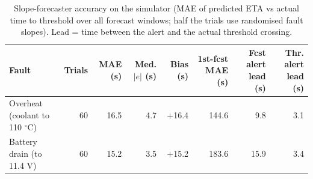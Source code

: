 \begin{table}[t]
\centering
\caption{Slope-forecaster accuracy on the simulator (MAE of predicted ETA vs actual time to threshold over all forecast windows; half the trials use randomised fault slopes). Lead = time between the alert and the actual threshold crossing.}
\label{tab:sys_forecast}
\scriptsize
\begin{tabular}{lrrrrrrr}
\toprule
Fault & Trials & MAE (s) & Med. $|e|$ (s) & Bias (s) & 1st-fcst MAE (s) & Fcst alert lead (s) & Thr. alert lead (s) \\
\midrule
Overheat (coolant to 110 $^\circ$C) & 60 & 16.5 & 4.7 & +16.4 & 144.6 & 9.8 & 3.1 \\
Battery drain (to 11.4 V) & 60 & 15.2 & 3.5 & +15.2 & 183.6 & 15.9 & 3.4 \\
\bottomrule
\end{tabular}
\end{table}
